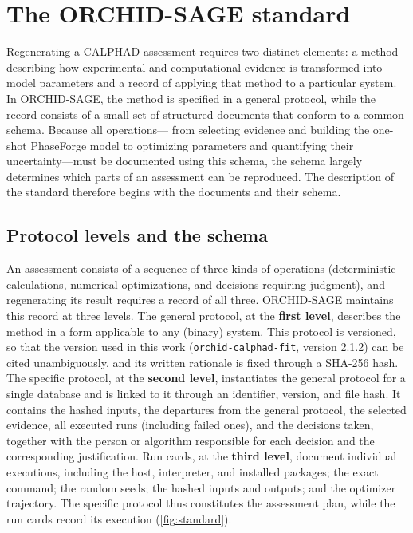 \section{The ORCHID-SAGE standard}
\label{sec:methods}

Regenerating a CALPHAD assessment requires two distinct elements: a method describing how experimental and computational evidence is transformed into model parameters and a record of applying that method to a particular system. In ORCHID-SAGE, the method is specified in a general protocol, while the record consists of a small set of structured documents that conform to a common schema. Because all operations--- from selecting evidence and building the one-shot PhaseForge model to optimizing parameters and quantifying their uncertainty---must be documented using this schema, the schema largely determines which parts of an assessment can be reproduced. The description of the standard therefore begins with the documents and their schema.

\subsection{Protocol levels and the schema}
\label{sec:methods:levels}

An assessment consists of a sequence of three kinds of operations (deterministic calculations, numerical optimizations, and decisions requiring judgment), and regenerating its result requires a record of all three. ORCHID-SAGE maintains this record at three levels. The general protocol, at the \textbf{first level}, describes the method in a form applicable to any (binary) system. This protocol is versioned, so that the version used in this work (\texttt{orchid-calphad-fit}, version 2.1.2) can be cited unambiguously, and its written rationale is fixed through a SHA-256 hash. The specific protocol, at the \textbf{second level}, instantiates the general protocol for a single database and is linked to it through an identifier, version, and file hash. It contains the hashed inputs, the departures from the general protocol, the selected evidence, all executed runs (including failed ones), and the decisions taken, together with the person or algorithm responsible for each decision and the corresponding justification. Run cards, at the \textbf{third level}, document individual executions, including the host, interpreter, and installed packages; the exact command; the random seeds; the hashed inputs and outputs; and the optimizer trajectory. The specific protocol thus constitutes the assessment plan, while the run cards record its execution (\cref{fig:standard}).

